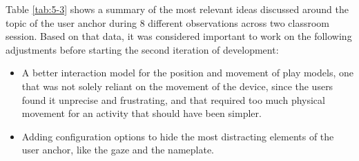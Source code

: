 Table \ref{tab:5-3} shows a summary of the most relevant ideas discussed around the topic of the user anchor during 8 different observations across two classroom session.
Based on that data, it was considered important to work on the following adjustments before starting the second iteration of development:

\begin{itemize}
    \item A better interaction model for the position and movement of play models, one that was not solely reliant on the movement of the device, since the users found it
    unprecise and frustrating, and that required too much physical movement for an activity that should have been simpler.
    \item Adding configuration options to hide the most distracting elements of the user anchor, like the gaze and the nameplate.
\end{itemize}

